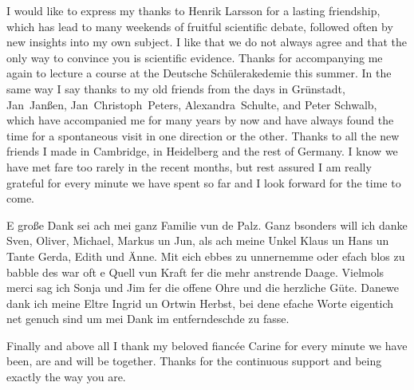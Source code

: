 I would like to express my thanks to Henrik Larsson
for a lasting friendship,
which has lead to many weekends of fruitful
scientific debate,
followed often by new insights into my own subject.
I like that we do not always agree
and that the only way to convince you is scientific evidence.
Thanks for accompanying me again
to lecture a course at the Deutsche Schülerakedemie this summer.
In the same way I say thanks to my old friends
from the days in Grünstadt,
Jan~Janßen,
Jan~Christoph~Peters,
Alexandra~Schulte,
and
Peter Schwalb,
which have accompanied me for many years by now
and have always found the time for a spontaneous visit
in one direction or the other.
Thanks to all the new friends I made in Cambridge,
in Heidelberg and the rest of Germany.
I know we have met fare too rarely in the recent months,
but rest assured I am really
grateful for every minute we have spent so far
and I look forward for the time to come.


E große Dank sei ach
mei ganz Familie vun de Palz.
Ganz bsonders will ich danke Sven, Oliver,
Michael, Markus un Jun,
als ach meine Unkel Klaus un Hans
un Tante Gerda, Edith und Änne.
Mit eich ebbes zu unnernemme oder efach blos zu babble
des war oft e Quell vun Kraft fer die mehr anstrende Daage.
Vielmols merci sag ich Sonja und Jim
fer die offene Ohre und die herzliche Güte.
Danewe dank ich meine Eltre Ingrid un Ortwin Herbst,
bei dene efache Worte eigentich net genuch sind
um mei Dank im entferndeschde zu fasse.


Finally and above all I thank my beloved fianc\'ee Carine
for every minute we have been, are and will be together.
Thanks for the continuous support and being exactly the way you are.

